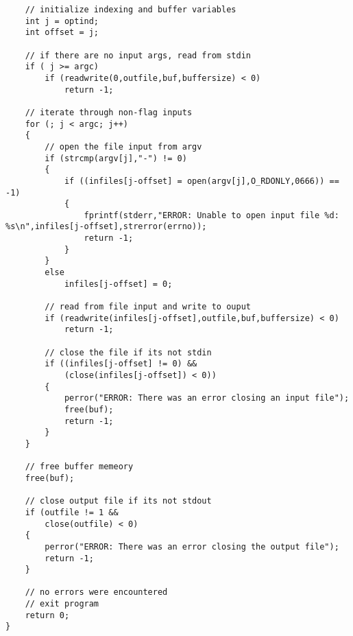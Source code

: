 \documentclass[12pt]{article}
\begin{document}
\begin{lstlisting}
	// initialize indexing and buffer variables
	int j = optind;
	int offset = j;

	// if there are no input args, read from stdin
	if ( j >= argc)
		if (readwrite(0,outfile,buf,buffersize) < 0)
			return -1;

	// iterate through non-flag inputs
	for (; j < argc; j++)
	{
		// open the file input from argv
		if (strcmp(argv[j],"-") != 0)
		{
			if ((infiles[j-offset] = open(argv[j],O_RDONLY,0666)) == -1)
			{
				fprintf(stderr,"ERROR: Unable to open input file %d: %s\n",infiles[j-offset],strerror(errno));
				return -1;
			}
		}
		else
			infiles[j-offset] = 0;

		// read from file input and write to ouput
		if (readwrite(infiles[j-offset],outfile,buf,buffersize) < 0)
			return -1;
		
		// close the file if its not stdin
		if ((infiles[j-offset] != 0) &&
			(close(infiles[j-offset]) < 0))
		{
			perror("ERROR: There was an error closing an input file");
			free(buf);
			return -1;
		}
	}

	// free buffer memeory
	free(buf);

	// close output file if its not stdout
	if (outfile != 1 &&
		close(outfile) < 0)
	{
		perror("ERROR: There was an error closing the output file");
		return -1;
	}

	// no errors were encountered
	// exit program
	return 0; 
}
\end{lstlisting}
\end{document}
